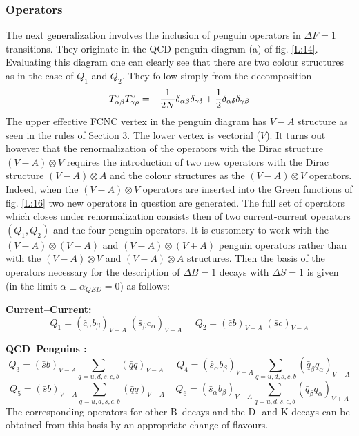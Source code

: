 \documentclass[12pt,rotate]{article}
\begin{document}
\begin{itemize}
\begin{itemize}
\subsubsection{Operators}
The next generalization involves the inclusion of penguin operators
in $\Delta F=1$ transitions. They originate in the QCD penguin diagram 
(a) of fig. \ref{L:14}. Evaluating this diagram one can clearly see 
that there are two
colour structures as in the case of $Q_1$ and $Q_2$. They follow simply
from the decomposition
\begin{equation}\label{tata1}
T^a_{\alpha\beta}T^a_{\gamma\rho}
=-{1\over 2N}\delta_{\alpha\beta}\delta_{\gamma\delta}+{1\over 2}
\delta_{\alpha\delta}\delta_{\gamma\beta}
\end{equation}
The upper effective FCNC vertex in the penguin diagram has $V-A$
structure as seen in the rules of Section 3. The lower vertex is
vectorial ($V$). It turns out however that the renormalization
of the operators with the Dirac structure $(V-A)\otimes V$ requires
the introduction of two new operators with the Dirac structure 
$(V-A)\otimes A$ and the colour structures as the $(V-A)\otimes V$
operators. Indeed, when the $(V-A)\otimes V$ operators are inserted
into the Green functions of fig. \ref{L:16} two new operators in question
are generated. The full set of operators which closes under
renormalization consists then of two current-current operators
$(Q_1,Q_2)$ and the four penguin operators. It is customery to
work with the  $(V-A)\otimes(V-A)$ and  $(V-A)\otimes(V+A)$
penguin operators rather than with the
$(V-A)\otimes V$ and  $(V-A)\otimes A$ structures. Then the
basis of the operators  necessary for the description of
$\Delta B=1$ decays with $\Delta S=1$ 
is given (in the limit $\alpha\equiv\alpha_{QED}=0$) 
as follows:

{\bf Current--Current: }
\begin{equation}\label{O1} 
Q_1 = (\bar c_{\alpha} b_{\beta})_{V-A}\;(\bar s_{\beta} c_{\alpha})_{V-A}
~~~~~~Q_2 = (\bar c b)_{V-A}\;(\bar s c)_{V-A} 
\end{equation}

{\bf QCD--Penguins :}
\begin{equation}\label{O2}
Q_3 = (\bar s b)_{V-A} \sum_{q=u,d,s,c,b}(\bar qq)_{V-A}~~~~~~   
 Q_4 = (\bar s_{\alpha} b_{\beta})_{V-A}\sum_{q=u,d,s,c,b}(\bar q_{\beta} 
       q_{\alpha})_{V-A} 
\end{equation}
\begin{equation}\label{O3}
 Q_5 = (\bar s b)_{V-A} \sum_{q=u,d,s,c,b}(\bar qq)_{V+A}~~~~~  
 Q_6 = (\bar s_{\alpha} b_{\beta})_{V-A}\sum_{q=u,d,s,c,b}
       (\bar q_{\beta} q_{\alpha})_{V+A} 
\end{equation}
The corresponding operators for other B--decays and the D- and
K-decays can be obtained from this basis by an appropriate
change of flavours.


\end{itemize}
\end{itemize}
\end{document}
